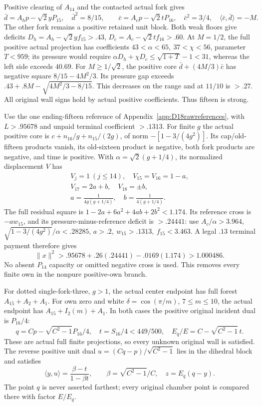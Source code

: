 \documentclass[11pt]{article}
\theoremstyle{definition}
\theoremstyle{remark}
\newcommand{\ip}[2]{\langle #1,#2\rangle}
\newcommand{\norm}[1]{\lVert #1\rVert}
\begin{document}
Positive clearing of \(A_{14}\) and the contacted actual fork gives
\[
 \bar d=A_hp-\sqrt2yP_{15},\quad \bar d^2=8/15,\qquad
 \bar c=A_cp-\sqrt2tP_{16},\quad \bar c^2=3/4,\quad
 \ip{\bar c}{\bar d}=-M .
\]
The other fork remains a positive retained unit block.
Both weak floors give deficits
\(D_h=A_h-\sqrt2y f_{15}>.43\),
\(D_c=A_c-\sqrt2t f_{16}>.60\).
At \(M=1/2\), the full positive actual projection has coefficients
\(43<\alpha<65,\ 37<\chi<56\), parameter \(T<959\);
its pressure would require
\(\alpha D_h+\chi D_c\leq\sqrt{1+T}-1<31\),
whereas the left side exceeds \(40.69\).
For \(M\geq1/\sqrt2\), the positive core
\(\bar d+(4M/3)\bar c\) has negative square
\(8/15-4M^2/3\).
Its pressure gap exceeds
\(.43+.8M-\sqrt{4M^2/3-8/15}\).
This decreases on the range and at \(11/10\) is \(>.27\).
All original wall signs hold by actual positive coefficients.
Thus fifteen is strong.

Use the one ending-fifteen reference of
Appendix~\ref{app:D18rawreferences}, with \(L>.95678\) and
unpaid terminal coefficient \(>.1313\).
For finite \(g\) the actual positive core is
\(c+n_{16}/g+n_{15}/(2g)\), of norm
\(-[1-3/(4g^2)]\).
Its cap/old-fifteen products vanish, its old-sixteen product is
negative, both fork products are negative, and time is positive.
With \(\alpha=\sqrt2(g+1/4)\), its normalized displacement \(V\)
has
\[
\begin{gathered}
 V_j=1\ (j\leq14),\quad V_{15}=V_{16}=1-a,\\
 V_{17}=2a+b,\quad V_{18}=\pm b,\\
 a=\frac1{4g(g+1/4)},\quad b=\frac1{4(g+1/4)} .
\end{gathered}
\]
The full residual square is
\(1-2a+6a^2+4ab+2b^2<1.174\).
Its reference cross is \(-aw_{15}\), and its
pressure-minus-reference deficit is \(>.24441\):
use \(A_c/\alpha>3.964\),
\(\sqrt{1-3/(4g^2)}/\alpha<.28285\),
\(a>.2,\ w_{15}>.1313,\ f_{15}<3.463\).
A legal \(.13\) terminal payment therefore gives
\[
 \norm x^2>.95678+.26(.24441)-.0169(1.174)>1.000486.
\]
No absent \(P_{14}\) capacity or omitted negative cross is used.
This removes every finite own in the nonpure positive-own branch.

For dotted single-fork-three, \(g>1\), the actual center endpoint
has full forest \(A_{15}+A_2+A_1\).
For own zero and white \(\delta=\cos(\pi/m)\), \(7\leq m\leq10\),
the actual endpoint has \(A_{15}+I_2(m)+A_1\).
In both cases the positive original incident dual is \(P_{16}/4\):
\[
 q=Cp-\sqrt{C^2-1}P_{16}/4,\quad
 t=S_{16}/4<449/500,\quad E_q/E=C-\sqrt{C^2-1}\,t .
\]
These are actual full finite projections, so every unknown original
wall is satisfied. The reverse positive unit dual
\(u=(Cq-p)/\sqrt{C^2-1}\) lies in the dihedral block and satisfies
\[
 \ip yu=\frac{\beta-t}{1-\beta t},\qquad
 \beta=\sqrt{C^2-1}/C,\quad z=E_q(q-y).
\]
The point \(q\) is never asserted farthest; every original chamber
point is compared there with factor \(E/E_q\).
\end{document}
